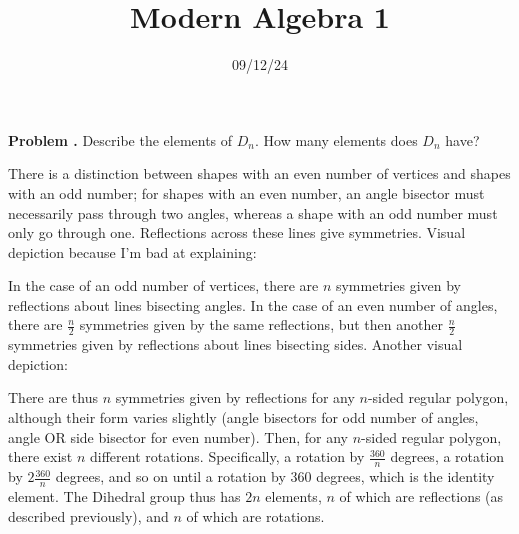 \documentclass[11pt, letterpaper]{report}
\title{Modern Algebra 1}
\date{09/12/24}
\newcounter{prob}\setcounter{prob}{0}
\renewcommand{\theprob}{\textbf{Problem \arabic{prob}. }}
\newcommand{\problem}{\stepcounter{prob}\noindent\theprob}
\renewenvironment{solution}[1][]{\begin{bwaaa}}{\end{bwaaa}\vspace{10pt}}
\begin{document}
\makeproblem
\problem Describe the elements of $D_n$. How many elements does $D_n$ have?
\begin{solution}
	There is a distinction between shapes with an even number of vertices and shapes with an odd number; for shapes with an even number, an angle bisector must necessarily pass through two angles, whereas a shape with an odd number must only go through one. Reflections across these lines give symmetries. Visual depiction because I'm bad at explaining:

	\begin{center}
\end{center}
In the case of an odd number of vertices, there are $n$ symmetries given by reflections about lines bisecting angles. In the case of an even number of angles, there are $\frac{n}{2}$ symmetries given by the same reflections, but then another $\frac{n}{2}$ symmetries given by reflections about lines bisecting sides. Another visual depiction:
\begin{center}
\end{center}
There are thus $n$ symmetries given by reflections for any $n$-sided regular polygon, although their form varies slightly (angle bisectors for odd number of angles, angle OR side bisector for even number). Then, for any $n$-sided regular polygon, there exist $n$ different rotations. Specifically, a rotation by $\frac{360}{n}$ degrees, a rotation by $2 \frac{360}{n}$ degrees, and so on until a rotation by $360$ degrees, which is the identity element. The Dihedral group thus has $2n$ elements, $n$ of which are reflections (as described previously), and $n$ of which are rotations.
\end{solution}
\end{document}
